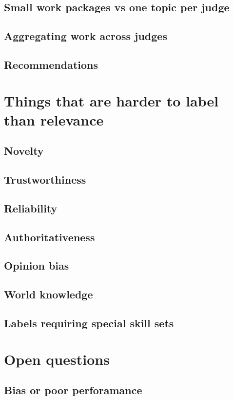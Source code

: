\documentclass[nobib]{tufte-book}
\begin{document}
\section{Small work packages vs one topic per judge}
\section{Aggregating work across judges}
\section{Recommendations}

\chapter{Things that are harder to label than relevance}

\section{Novelty}
\section{Trustworthiness}
\section{Reliability}
\section{Authoritativeness}
\section{Opinion bias}
\section{World knowledge}
\section{Labels requiring special skill sets}

\chapter{Open questions}

\section{Bias or poor perforamance}
\end{document}
